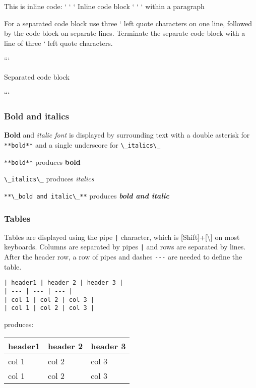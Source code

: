 \documentclass{book}
\newcommand{\passthrough}[1]{#1}
\begin{document}
This is inline code: ` ` ` Inline code block ` ` ` within a paragraph

For a separated code block use three ` left quote characters on one
line, followed by the code block on separate lines. Terminate the
separate code block with a line of three ` left quote characters.

```

Separated code block

```

\hypertarget{bold-and-italics}{%
\subsubsection{Bold and italics}\label{bold-and-italics}}

\textbf{Bold} and \emph{italic font} is displayed by surrounding text
with a double asterisk for \passthrough{\lstinline!**bold**!} and a
single underscore for \passthrough{\lstinline!\_italics\_!}

\passthrough{\lstinline!**bold**!} produces \textbf{bold}

\passthrough{\lstinline!\_italics\_!} produces \emph{italics}

\passthrough{\lstinline!**\_bold and italic\_**!} produces
\textbf{\emph{bold and italic}}

\hypertarget{tables}{%
\subsubsection{Tables}\label{tables}}

Tables are displayed using the pipe \passthrough{\lstinline!|!}
character, which is {[}Shift{]}+{[}\textbackslash{}{]} on most
keyboards. Columns are separated by pipes \passthrough{\lstinline!|!}
and rows are separated by lines. After the header row, a row of pipes
and dashes \passthrough{\lstinline!---!} are needed to define the table.

\begin{lstlisting}
| header1 | header 2 | header 3 |
| --- | --- | --- |
| col 1 | col 2 | col 3 |
| col 1 | col 2 | col 3 |
\end{lstlisting}

produces:

\begin{longtable}[]{@{}lll@{}}
\toprule
header1 & header 2 & header 3\tabularnewline
\midrule
\endhead
col 1 & col 2 & col 3\tabularnewline
col 1 & col 2 & col 3\tabularnewline
\bottomrule
\end{longtable}
\end{document}
